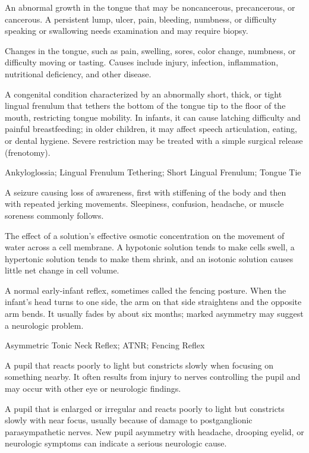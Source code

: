  An abnormal growth in the tongue that may be noncancerous, precancerous, or cancerous. A persistent lump, ulcer, pain, bleeding, numbness, or difficulty speaking or swallowing needs examination and may require biopsy.

 Changes in the tongue, such as pain, swelling, sores, color change, numbness, or difficulty moving or tasting. Causes include injury, infection, inflammation, nutritional deficiency, and other disease.

 A congenital condition characterized by an abnormally short, thick, or tight lingual frenulum that tethers the bottom of the tongue tip to the floor of the mouth, restricting tongue mobility. In infants, it can cause latching difficulty and painful breastfeeding; in older children, it may affect speech articulation, eating, or dental hygiene. Severe restriction may be treated with a simple surgical release (frenotomy).

\synonyms
Ankyloglossia; Lingual Frenulum Tethering; Short Lingual Frenulum; Tongue Tie

 A seizure causing loss of awareness, first with stiffening of the body and then with repeated jerking movements. Sleepiness, confusion, headache, or muscle soreness commonly follows.

 The effect of a solution’s effective osmotic concentration on the movement of water across a cell membrane. A hypotonic solution tends to make cells swell, a hypertonic solution tends to make them shrink, and an isotonic solution causes little net change in cell volume.

 A normal early-infant reflex, sometimes called the fencing posture. When the infant’s head turns to one side, the arm on that side straightens and the opposite arm bends. It usually fades by about six months; marked asymmetry may suggest a neurologic problem.

\synonyms
Asymmetric Tonic Neck Reflex; ATNR; Fencing Reflex

 A pupil that reacts poorly to light but constricts slowly when focusing on something nearby. It often results from injury to nerves controlling the pupil and may occur with other eye or neurologic findings.

 A pupil that is enlarged or irregular and reacts poorly to light but constricts slowly with near focus, usually because of damage to postganglionic parasympathetic nerves. New pupil asymmetry with headache, drooping eyelid, or neurologic symptoms can indicate a serious neurologic cause.

